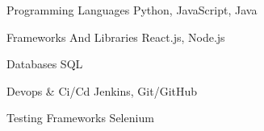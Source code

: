 

\begin{cvskills}

          \cvskill
            {Programming Languages} %
            {Python, JavaScript, Java} %
          

          \cvskill
            {Frameworks And Libraries} %
            {React.js, Node.js} %
          

          \cvskill
            {Databases} %
            {SQL} %
          

          \cvskill
            {Devops \& Ci/Cd} %
            {Jenkins, Git/GitHub} %
          

          \cvskill
            {Testing Frameworks} %
            {Selenium} %
          
\end{cvskills}
